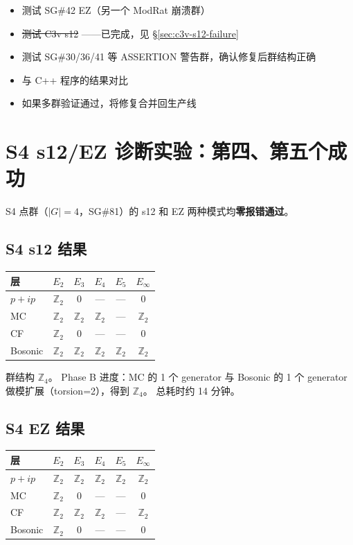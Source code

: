 \documentclass[a4paper,fontset=ubuntu,12pt]{ctexart}
\begin{document}
\begin{itemize}
\item 测试 SG\#42 EZ（另一个 ModRat 崩溃群）
\item \sout{测试 C3v s12} ——已完成，见 \S\ref{sec:c3v-s12-failure}
\item 测试 SG\#30/36/41 等 ASSERTION 警告群，确认修复后群结构正确
\item 与 C++ 程序的结果对比
\item 如果多群验证通过，将修复合并回生产线
\end{itemize}

\section{S4 s12/EZ 诊断实验：第四、第五个成功}
\label{sec:s4-success}

S4 点群（$|G|=4$，SG\#81）的 s12 和 EZ 两种模式均\textbf{零报错通过}。

\subsection{S4 s12 结果}

\begin{center}
\begin{tabular}{l|cccc|c}
\hline
层 & $E_2$ & $E_3$ & $E_4$ & $E_5$ & $E_\infty$ \\
\hline
$p{+}ip$ & $\mathbb{Z}_2$ & $0$ & --- & --- & $0$ \\
MC & $\mathbb{Z}_2$ & $\mathbb{Z}_2$ & $\mathbb{Z}_2$ & --- & $\mathbb{Z}_2$ \\
CF & $\mathbb{Z}_2$ & $0$ & --- & --- & $0$ \\
Bosonic & $\mathbb{Z}_2$ & $\mathbb{Z}_2$ & $\mathbb{Z}_2$ & $\mathbb{Z}_2$ & $\mathbb{Z}_2$ \\
\hline
\end{tabular}
\end{center}

群结构 $\mathbb{Z}_4$。
Phase B 进度：MC 的 1 个 generator 与 Bosonic 的 1 个 generator
做模扩展（torsion=2），得到 $\mathbb{Z}_4$。
总耗时约 14 分钟。

\subsection{S4 EZ 结果}

\begin{center}
\begin{tabular}{l|cccc|c}
\hline
层 & $E_2$ & $E_3$ & $E_4$ & $E_5$ & $E_\infty$ \\
\hline
$p{+}ip$ & $\mathbb{Z}_2$ & $\mathbb{Z}_2$ & $\mathbb{Z}_2$ & $\mathbb{Z}_2$ & $\mathbb{Z}_2$ \\
MC & $\mathbb{Z}_2$ & $0$ & --- & --- & $0$ \\
CF & $\mathbb{Z}_2$ & $\mathbb{Z}_2$ & $\mathbb{Z}_2$ & --- & $\mathbb{Z}_2$ \\
Bosonic & $\mathbb{Z}_2$ & $0$ & --- & --- & $0$ \\
\hline
\end{tabular}
\end{center}
\end{document}
